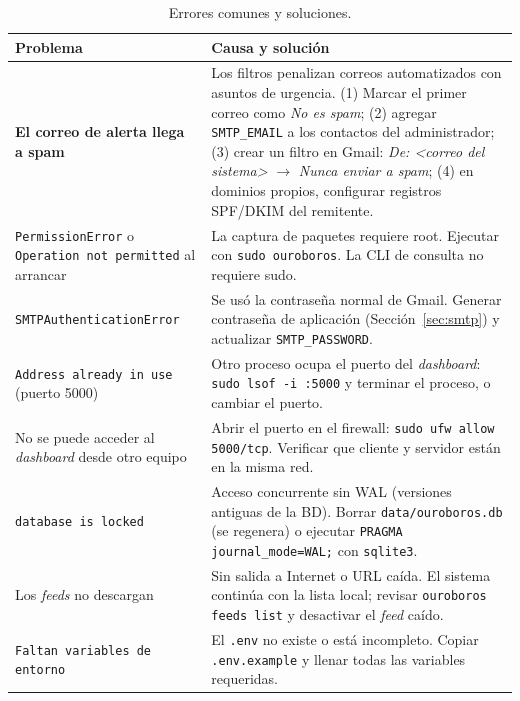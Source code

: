\documentclass[12pt,letterpaper]{report}
\begin{document}
\begin{table}[H]
\centering
\caption{Errores comunes y soluciones.}
\label{tab:trouble}
\begin{tabular}{p{4.8cm}p{9.0cm}}
\toprule
\textbf{Problema} & \textbf{Causa y solución} \\
\midrule
\textbf{El correo de alerta llega a spam} &
Los filtros penalizan correos automatizados con asuntos de urgencia. (1)
Marcar el primer correo como \textit{No es spam}; (2) agregar
\texttt{SMTP\_EMAIL} a los contactos del administrador; (3) crear un filtro
en Gmail: \textit{De: <correo del sistema>} $\rightarrow$ \textit{Nunca
enviar a spam}; (4) en dominios propios, configurar registros SPF/DKIM del
remitente. \\
\midrule
\texttt{PermissionError} o \texttt{Operation not permitted} al arrancar &
La captura de paquetes requiere root. Ejecutar con \texttt{sudo ouroboros}.
La CLI de consulta no requiere sudo. \\
\midrule
\texttt{SMTPAuthenticationError} &
Se usó la contraseña normal de Gmail. Generar contraseña de aplicación
(Sección~\ref{sec:smtp}) y actualizar \texttt{SMTP\_PASSWORD}. \\
\midrule
\texttt{Address already in use} (puerto 5000) &
Otro proceso ocupa el puerto del \textit{dashboard}:
\texttt{sudo lsof -i :5000} y terminar el proceso, o cambiar el puerto. \\
\midrule
No se puede acceder al \textit{dashboard} desde otro equipo &
Abrir el puerto en el firewall: \texttt{sudo ufw allow 5000/tcp}. Verificar
que cliente y servidor están en la misma red. \\
\midrule
\texttt{database is locked} &
Acceso concurrente sin WAL (versiones antiguas de la BD). Borrar
\texttt{data/ouroboros.db} (se regenera) o ejecutar
\texttt{PRAGMA journal\_mode=WAL;} con \texttt{sqlite3}. \\
\midrule
Los \textit{feeds} no descargan &
Sin salida a Internet o URL caída. El sistema continúa con la lista local;
revisar \texttt{ouroboros feeds list} y desactivar el \textit{feed} caído. \\
\midrule
\texttt{Faltan variables de entorno} &
El \texttt{.env} no existe o está incompleto. Copiar
\texttt{.env.example} y llenar todas las variables requeridas. \\
\bottomrule
\end{tabular}
\end{table}

\end{document}
